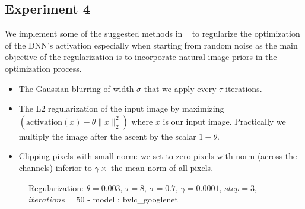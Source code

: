 \documentclass[10pt]{article}
\begin{document}
\subsection{Experiment 4}
We implement some of the suggested methods in ~\cite{yosinski2015understanding} \cite{simonyan2013deep} to regularize the optimization of the DNN's activation especially when starting from random noise as the main objective of the regularization is to incorporate natural-image priors in the optimization process. 
\begin{itemize}
\item The Gaussian blurring of width $\sigma$ that we apply every $\tau$ iterations.
\item The L2 regularization of the input image by maximizing $(\text{activation}(x) -\theta \|x\|_2^2)$ where $x$ is our input image. Practically we multiply the image after the ascent by the scalar $1-\theta$.
\item Clipping pixels with small norm: we set to zero pixels with norm (across the channels) inferior to $\gamma\times$ the mean norm of all pixels.
\end{itemize} 
\begin{figure}[H]
    \centering
    \vspace{1pt}
    \vspace{5pt}
    \vspace{1pt}
    \vspace{5pt}

    \vspace{1pt}
    \caption{Regularization: $\theta=0.003$, $\tau=8$, $\sigma=0.7$, $\gamma=0.0001$, $step=3$, $iterations= 50$ - model : bvlc\_googlenet}
\end{figure}
{\small


}
\end{document}
